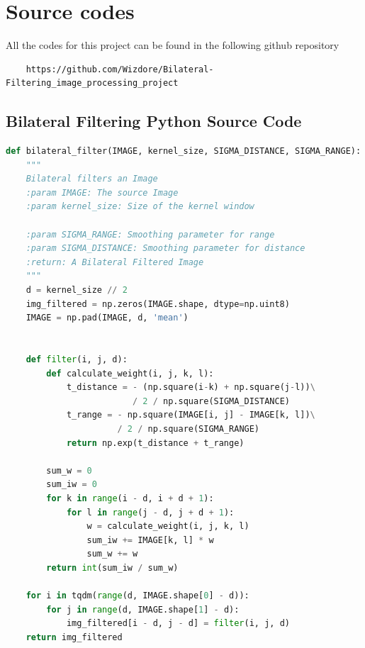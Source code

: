 \documentclass[a4paper, english]{article}
\begin{document}
\section{Source codes}

All the codes for this project can be found in the following github repository
\centering
    \begin{verbatim}
    https://github.com/Wizdore/Bilateral-Filtering_image_processing_project
    \end{verbatim}

\subsection{Bilateral Filtering Python Source Code}
\begin{lstlisting}[language=Python, caption=Bilateral Filtering function, label=bilateralfiltering]
def bilateral_filter(IMAGE, kernel_size, SIGMA_DISTANCE, SIGMA_RANGE):
    """
    Bilateral filters an Image
    :param IMAGE: The source Image
    :param kernel_size: Size of the kernel window

    :param SIGMA_RANGE: Smoothing parameter for range
    :param SIGMA_DISTANCE: Smoothing parameter for distance
    :return: A Bilateral Filtered Image
    """
    d = kernel_size // 2
    img_filtered = np.zeros(IMAGE.shape, dtype=np.uint8)
    IMAGE = np.pad(IMAGE, d, 'mean')


    def filter(i, j, d):
        def calculate_weight(i, j, k, l):
            t_distance = - (np.square(i-k) + np.square(j-l))\
                         / 2 / np.square(SIGMA_DISTANCE)
            t_range = - np.square(IMAGE[i, j] - IMAGE[k, l])\
                      / 2 / np.square(SIGMA_RANGE)
            return np.exp(t_distance + t_range)

        sum_w = 0
        sum_iw = 0
        for k in range(i - d, i + d + 1):
            for l in range(j - d, j + d + 1):
                w = calculate_weight(i, j, k, l)
                sum_iw += IMAGE[k, l] * w
                sum_w += w
        return int(sum_iw / sum_w)

    for i in tqdm(range(d, IMAGE.shape[0] - d)):
        for j in range(d, IMAGE.shape[1] - d):
            img_filtered[i - d, j - d] = filter(i, j, d)
    return img_filtered

\end{lstlisting}
\newpage
\end{document}
